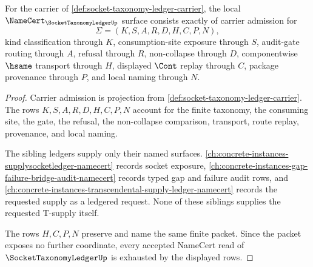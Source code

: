 \begin{theorem}
\label{thm:socket-taxonomy-ledger-namecert-obligations}
For the carrier of \autoref{def:socket-taxonomy-ledger-carrier}, the local $\NameCert_{\SocketTaxonomyLedgerUp}$ surface consists exactly of carrier admission for
$$
\Sigma=(K,S,A,R,D,H,C,P,N),
$$
kind classification through $K$, consumption-site exposure through $S$, audit-gate routing through $A$, refusal through $R$, non-collapse through $D$, componentwise $\hsame$ transport through $H$, displayed $\Cont$ replay through $C$, package provenance through $P$, and local naming through $N$.
\end{theorem}
\begin{proof}
Carrier admission is projection from \autoref{def:socket-taxonomy-ledger-carrier}. The rows $K,S,A,R,D,H,C,P,N$ account for the finite taxonomy, the consuming site, the gate, the refusal, the non-collapse comparison, transport, route replay, provenance, and local naming.

The sibling ledgers supply only their named surfaces. \autoref{ch:concrete-instances-supplysocketledger-namecert} records socket exposure, \autoref{ch:concrete-instances-gap-failure-bridge-audit-namecert} records typed gap and failure audit rows, and \autoref{ch:concrete-instances-transcendental-supply-ledger-namecert} records the requested supply as a ledgered request. None of these siblings supplies the requested T-supply itself.

The rows $H,C,P,N$ preserve and name the same finite packet. Since the packet exposes no further coordinate, every accepted NameCert read of $\SocketTaxonomyLedgerUp$ is exhausted by the displayed rows.
\end{proof}

